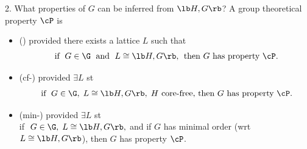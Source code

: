 \begin{frame}[label=IEProps]{2. What properties of $G$ can be inferred from $\lb H,G \rb$?}
A group theoretical property $\cP$  %
is
\vskip2mm
\begin{itemize}
\item 
{} (\IE) provided there exists a lattice
$L$ such that
\[
\text{ if $\;G\in \G\;$ and $\;L\cong \lb H,G \rb,\;$  then $G$ has property $\cP$.}
\]
\vskip2mm

\item
{} (cf-\IE) provided
$\exists L$ st
\[
\text{ if $\;G\in \G,\; L\cong \lb H,G \rb,\;H$ core-free, then $G$ has property $\cP$.}
\]
\vskip2mm

\item 
{} (min-\IE)
provided $\exists L$ st\\ 
if $\;G\in \G,\; L\cong \lb H,G \rb,$ and if $G$ has minimal order (wrt
$L\cong \lb H,G \rb$), then $G$ has property $\cP$.    
\end{itemize}

\end{frame}

